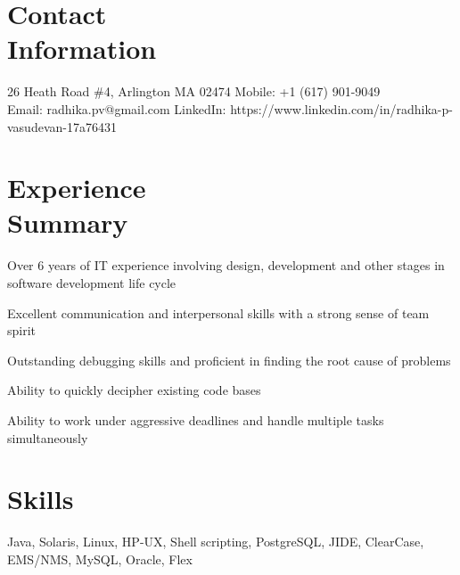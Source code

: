 \documentclass[margin]{resume}
\begin{document}
\begin{resume}

    \section{\mysidestyle Contact\\Information}

    26 Heath Road \#4, Arlington MA 02474   \hfill Mobile: +1 (617) 901-9049          \\
    Email: radhika.pv@gmail.com \hfill LinkedIn: https://www.linkedin.com/in/radhika-p-vasudevan-17a76431 \\

			\vspace{-5mm}
    \section{\mysidestyle Experience \\ Summary}
		\begin{list2}
    \item Over 6 years of IT experience involving design, development and other stages in software development life cycle
    \item Excellent communication and interpersonal skills with a strong sense of team spirit
    \item Outstanding debugging skills and proficient in finding the root cause of problems
    \item Ability to quickly decipher existing code bases
		\item Ability to work under aggressive deadlines and handle multiple tasks simultaneously
		\end{list2}

    \section{\mysidestyle Skills}
		Java, Solaris, Linux, HP-UX, Shell scripting, PostgreSQL, JIDE, ClearCase, EMS/NMS, MySQL, Oracle, Flex


\end{resume}
\end{document}
